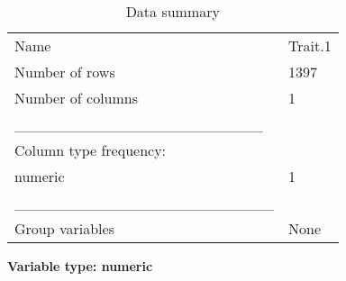 \documentclass[
]{article}
\begin{document}
\begin{longtable}[]{@{}ll@{}}
\caption{Data summary}\tabularnewline
\toprule()
\endhead
Name & Trait.1 \\
Number of rows & 1397 \\
Number of columns & 1 \\
\_\_\_\_\_\_\_\_\_\_\_\_\_\_\_\_\_\_\_\_\_\_\_ & \\
Column type frequency: & \\
numeric & 1 \\
\_\_\_\_\_\_\_\_\_\_\_\_\_\_\_\_\_\_\_\_\_\_\_\_ & \\
Group variables & None \\
\bottomrule()
\end{longtable}

\textbf{Variable type: numeric}
\end{document}
